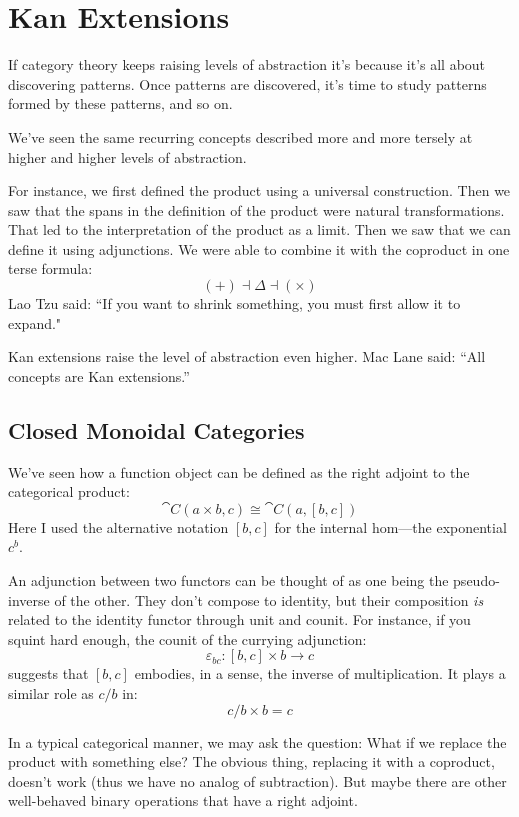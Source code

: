 \documentclass[DaoFP]{subfiles}
\begin{document}
\setcounter{chapter}{18}

\chapter{Kan Extensions}

If category theory keeps raising levels of abstraction it's because it's all about discovering patterns. Once patterns are discovered, it's time to study patterns formed by these patterns, and so on. 

We've seen the same recurring concepts described more and more tersely at higher and higher levels of abstraction. 

For instance, we first defined the product using a universal construction. Then we saw that the spans in the definition of the product were natural transformations. That led to the interpretation of the product as a limit. Then we saw that we can define it using adjunctions. We were able to combine it with the coproduct in one terse formula:
\[ (+) \dashv \Delta \dashv (\times) \]
Lao Tzu said: ``If you want to shrink something, you must first allow it to expand."

Kan extensions raise the level of abstraction even higher. Mac Lane said: ``All concepts are Kan extensions.''

\section{Closed Monoidal Categories}

We've seen how a function object can be defined as the right adjoint to the categorical product:
\[ \cat C (a \times b, c) \cong \cat C (a, [b, c]) \]
Here I used the alternative notation $[b, c]$ for the internal hom---the exponential $c^b$. 

An adjunction between two functors can be thought of as one being the pseudo-inverse of the other. They don't compose to identity, but their composition \emph{is} related to the identity functor through unit and counit. For instance, if you squint hard enough, the counit of the currying adjunction:
\[ \varepsilon_{b c} \colon [b, c] \times b \to c \]
suggests that $[b, c]$ embodies, in a sense, the inverse of multiplication. It plays a similar role as $c/b$ in:
\[ c/b \times b = c \]

In a typical categorical manner, we may ask the question: What if we replace the product with something else? The obvious thing, replacing it with a coproduct, doesn't work (thus we have no analog of subtraction). But maybe there are other well-behaved binary operations that have a right adjoint.
\end{document}
